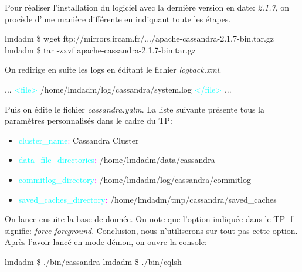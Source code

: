 \par Pour réaliser l'installation du logiciel avec la dernière version en date: \textit{2.1.7},\newline
on procède d'une manière différente en indiquant toute les étapes.\newline
\begin{tt}
lmdadm \$ wget ftp://mirrors.ircam.fr/.../apache-cassandra-2.1.7-bin.tar.gz \newline
lmdadm \$ tar -zxvf apache-cassandra-2.1.7-bin.tar.gz \newline
\end{tt}
On redirige en suite les logs en éditant le fichier \textit{logback.xml}. \newline
\begin{tt}
... \newline
\textcolor{cyan}{<file>} /home/lmdadm/log/cassandra/system.log \textcolor{cyan}{</file>} \newline
... \newline
\end{tt}
Puis on édite le fichier \textit{cassandra.yalm}. La liste suivante présente tous la paramètres personnalisés dans le cadre du TP:
\begin{itemize}
\item \textcolor{cyan}{cluster\_name}\textcolor{magenta}{:} Cassandra Cluster
\item \textcolor{cyan}{data\_file\_directories}\textcolor{magenta}{:} /home/lmdadm/data/cassandra
\item \textcolor{cyan}{commitlog\_directory}\textcolor{magenta}{:} /home/lmdadm/log/cassandra/commitlog
\item \textcolor{cyan}{saved\_caches\_directory}\textcolor{magenta}{:} /home/lmdadm/tmp/cassandra/saved\_caches
\end{itemize}
On lance ensuite la base de donnée. On note que l'option indiquée dans le TP -f
signifie: \textit{force foreground}. Conclusion, nous n'utiliserons sur tout pas cette option. Après l'avoir lancé en mode démon, on ouvre la console: \newline
\begin{tt}
lmdadm \$ ./bin/cassandra \newline
lmdadm \$ ./bin/cqlsh \newline
\end{tt}
